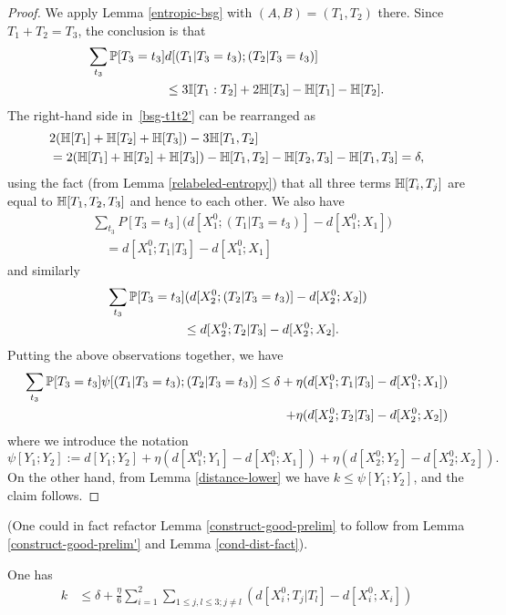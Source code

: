 \begin{proof} \leanok
  We apply Lemma \ref{entropic-bsg} with $(A,B) = (T_1, T_2)$ there.
  Since $T_1 + T_2 = T_3$, the conclusion is that
  \begin{align} \nonumber \sum_{t_3} \mathbb{P}[T_3 = t_3] & d[(T_1 | T_3 = t_3); (T_2 | T_3 = t_3)] \\ & \leq 3 \mathbb{I}[T_1 : T_2] + 2 \mathbb{H}[T_3] - \mathbb{H}[T_1] - \mathbb{H}[T_2].\label{bsg-t1t2'}
  \end{align}
  The right-hand side in~\eqref{bsg-t1t2'} can be rearranged as
  \begin{align*} & 2( \mathbb{H}[T_1] + \mathbb{H}[T_2] + \mathbb{H}[T_3]) - 3 \mathbb{H}[T_1,T_2] \\ & = 2(\mathbb{H}[T_1] + \mathbb{H}[T_2] + \mathbb{H}[T_3]) - \mathbb{H}[T_1,T_2] - \mathbb{H}[T_2,T_3] - \mathbb{H}[T_1, T_3] = \delta,\end{align*}
  using the fact (from Lemma \ref{relabeled-entropy}) that all three terms $\mathbb{H}[T_i,T_j]$ are equal to $\mathbb{H}[T_1,T_2,T_3]$ and hence to each other.
  We also have
  \begin{align*}
  &  \sum_{t_3} P[T_3 = t_3] \bigl(d[X^0_1; (T_1 | T_3=t_3)] - d[X^0_1;X_1]\bigr) \\
  &\quad = d[X^0_1; T_1 | T_3] - d[X^0_1;X_1]
  \end{align*}
  and similarly
  \begin{align*}
  &  \sum_{t_3} \mathbb{P}[T_3 = t_3] (d[X^0_2;(T_2 | T_3=t_3)] - d[X^0_2; X_2]) \\
  &\quad\quad\quad\quad\quad\quad \leq d[X^0_2;T_2|T_3] - d[X^0_2;X_2].
  \end{align*}
  Putting the above observations together, we have
  \begin{align*}
   \sum_{t_3} \mathbb{P}[T_3=t_3] \psi[(T_1 | T_3=t_3); (T_2 | T_3=t_3)] \leq \delta + \eta (d[X^0_1;T_1|T_3]-d[X^0_1;X_1]) \\
     + \eta (d[X^0_2;T_2|T_3]-d[X^0_2;X_2])
   \end{align*}
where we introduce the notation
\[\psi[Y_1; Y_2] := d[Y_1;Y_2] +  \eta (d[X_1^0;Y_1] - d[X_1^0;X_1]) + \eta(d[X_2^0;Y_2] - d[X_2^0;X_2]).\]
On the other hand, from Lemma \ref{distance-lower} we have $k \leq \psi[Y_1;Y_2]$, and the claim follows.
\end{proof}

(One could in fact refactor Lemma \ref{construct-good-prelim} to follow from Lemma \ref{construct-good-prelim'} and Lemma \ref{cond-dist-fact}).

\begin{lemma}\label{construct-good-improv}\leanok
One has
\begin{align*}  k & \leq  \delta + \frac{\eta}{6}  \sum_{i=1}^2 \sum_{1 \leq j,l \leq 3; j \neq l} (d[X^0_i;T_j|T_l] - d[X^0_i; X_i])
  \end{align*}
\end{lemma}

